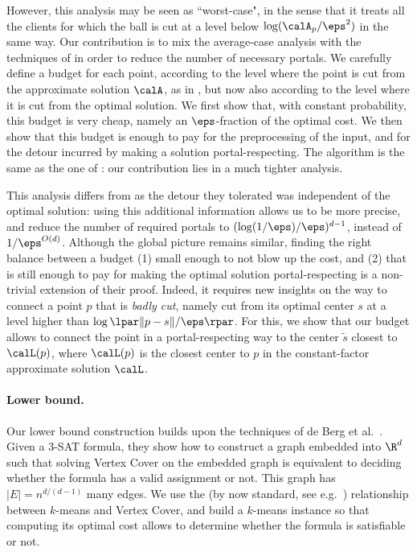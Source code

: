However, this analysis may be seen as ``worst-case", in the sense that it treats  all the clients for which the ball is cut at a level below $\log(\calA_p/\eps^2)$ in the same way. 
Our contribution is to mix the average-case analysis with the techniques of \cite{jacm} in order to reduce the number of necessary portals. 
We carefully define a budget for each point, according to the level where the point is cut from the approximate solution $\calA$, as in \cite{jacm}, but now also according to the level where it is cut from the optimal solution. 
We first show that, with constant probability, this budget is very cheap, namely an $\eps$-fraction of the optimal cost. 
We then show that this budget is enough to pay for the preprocessing of the input, and for the detour incurred by making a solution portal-respecting.  The algorithm is the same as the one of \cite{jacm}: our contribution lies in a much tighter analysis.

This analysis differs from \cite{jacm} as the detour they tolerated  was independent of the optimal solution: using this additional information allows us to be more precise, and reduce the number of required portals to $(\log(1/\eps)/\eps)^{d-1}$, instead of $1/\eps^{O(d)}$. 
Although the global picture remains similar, finding the right balance between a budget (1) small enough to not blow up the cost, and (2) that is still enough to pay for making the optimal solution portal-respecting is a non-trivial extension of their proof. 
Indeed, it requires new insights on the way to connect a point $p$ that is \emph{badly cut}, namely cut from its optimal center $s$ at a level higher than $\log\lpar \|p-s\|/\eps\rpar$.
For this, we show that our budget allows to connect the point in a portal-respecting way to the center $\tilde s$ closest to $\calL(p)$, where $\calL(p)$ is the closest center to $p$ in the constant-factor approximate solution $\calL$.

\paragraph*{Lower bound.}
Our lower bound construction builds upon the techniques of de Berg et al.~\cite{de2018framework}. Given a 3-SAT formula, they show how to construct a graph embedded into $\R^d$ such that solving Vertex Cover on the embedded graph is equivalent to deciding whether the formula has a valid assignment or not. This graph has $|E| = n^{d/(d-1)}$ many edges. We use the (by now standard, see e.g.~\cite{CohenaddadSODA18}) relationship between $k$-means and Vertex Cover, and build a $k$-means instance so that computing its optimal cost allows to determine whether the formula is satisfiable or not. 

